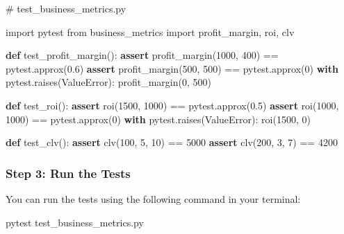 \documentclass[
  letterpaper,
  DIV=11,
  numbers=noendperiod]{scrreprt}
\newenvironment{Shaded}{\begin{snugshade}}{\end{snugshade}}
\newcommand{\CommentTok}[1]{\textcolor[rgb]{0.37,0.37,0.37}{#1}}
\newcommand{\ControlFlowTok}[1]{\textcolor[rgb]{0.00,0.23,0.31}{\textbf{#1}}}
\newcommand{\DecValTok}[1]{\textcolor[rgb]{0.68,0.00,0.00}{#1}}
\newcommand{\ExtensionTok}[1]{\textcolor[rgb]{0.00,0.23,0.31}{#1}}
\newcommand{\FloatTok}[1]{\textcolor[rgb]{0.68,0.00,0.00}{#1}}
\newcommand{\ImportTok}[1]{\textcolor[rgb]{0.00,0.46,0.62}{#1}}
\newcommand{\KeywordTok}[1]{\textcolor[rgb]{0.00,0.23,0.31}{\textbf{#1}}}
\newcommand{\NormalTok}[1]{\textcolor[rgb]{0.00,0.23,0.31}{#1}}
\newcommand{\OperatorTok}[1]{\textcolor[rgb]{0.37,0.37,0.37}{#1}}
\newcommand{\PreprocessorTok}[1]{\textcolor[rgb]{0.68,0.00,0.00}{#1}}
\begin{document}
\begin{Shaded}
\begin{Highlighting}[]
\CommentTok{\# test\_business\_metrics.py}

\ImportTok{import}\NormalTok{ pytest}
\ImportTok{from}\NormalTok{ business\_metrics }\ImportTok{import}\NormalTok{ profit\_margin, roi, clv}

\KeywordTok{def}\NormalTok{ test\_profit\_margin():}
    \ControlFlowTok{assert}\NormalTok{ profit\_margin(}\DecValTok{1000}\NormalTok{, }\DecValTok{400}\NormalTok{) }\OperatorTok{==}\NormalTok{ pytest.approx(}\FloatTok{0.6}\NormalTok{)}
    \ControlFlowTok{assert}\NormalTok{ profit\_margin(}\DecValTok{500}\NormalTok{, }\DecValTok{500}\NormalTok{) }\OperatorTok{==}\NormalTok{ pytest.approx(}\DecValTok{0}\NormalTok{)}
    \ControlFlowTok{with}\NormalTok{ pytest.raises(}\PreprocessorTok{ValueError}\NormalTok{):}
\NormalTok{        profit\_margin(}\DecValTok{0}\NormalTok{, }\DecValTok{500}\NormalTok{)}

\KeywordTok{def}\NormalTok{ test\_roi():}
    \ControlFlowTok{assert}\NormalTok{ roi(}\DecValTok{1500}\NormalTok{, }\DecValTok{1000}\NormalTok{) }\OperatorTok{==}\NormalTok{ pytest.approx(}\FloatTok{0.5}\NormalTok{)}
    \ControlFlowTok{assert}\NormalTok{ roi(}\DecValTok{1000}\NormalTok{, }\DecValTok{1000}\NormalTok{) }\OperatorTok{==}\NormalTok{ pytest.approx(}\DecValTok{0}\NormalTok{)}
    \ControlFlowTok{with}\NormalTok{ pytest.raises(}\PreprocessorTok{ValueError}\NormalTok{):}
\NormalTok{        roi(}\DecValTok{1500}\NormalTok{, }\DecValTok{0}\NormalTok{)}

\KeywordTok{def}\NormalTok{ test\_clv():}
    \ControlFlowTok{assert}\NormalTok{ clv(}\DecValTok{100}\NormalTok{, }\DecValTok{5}\NormalTok{, }\DecValTok{10}\NormalTok{) }\OperatorTok{==} \DecValTok{5000}
    \ControlFlowTok{assert}\NormalTok{ clv(}\DecValTok{200}\NormalTok{, }\DecValTok{3}\NormalTok{, }\DecValTok{7}\NormalTok{) }\OperatorTok{==} \DecValTok{4200}
\end{Highlighting}
\end{Shaded}

\subsubsection{Step 3: Run the Tests}\label{step-3-run-the-tests-1}

You can run the tests using the following command in your terminal:

\begin{Shaded}
\begin{Highlighting}[]
\ExtensionTok{pytest}\NormalTok{ test\_business\_metrics.py}
\end{Highlighting}
\end{Shaded}
\end{document}
